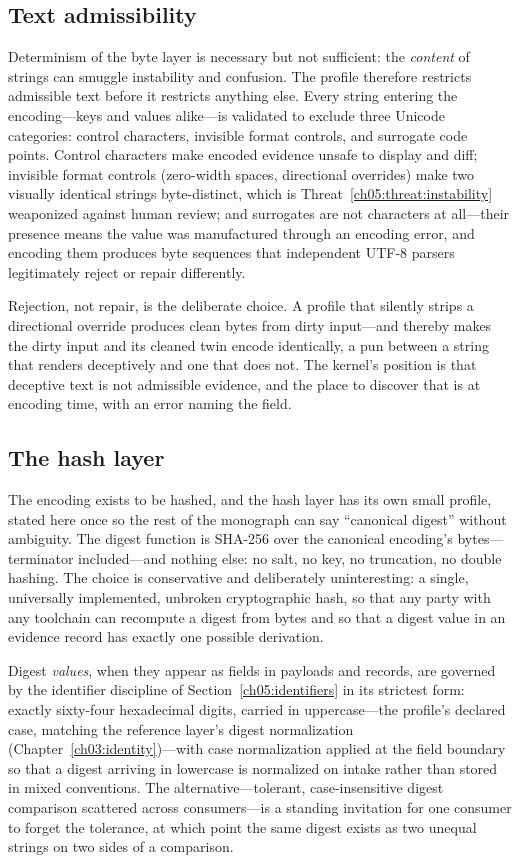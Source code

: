 \subsection{Text admissibility}

Determinism of the byte layer is necessary but not sufficient: the
\emph{content} of strings can smuggle instability and confusion. The profile
therefore restricts admissible text before it restricts anything else. Every
string entering the encoding---keys and values alike---is validated to
exclude three Unicode categories: control characters, invisible format
controls, and surrogate code points. Control characters make encoded
evidence unsafe to display and diff; invisible format controls (zero-width
spaces, directional overrides) make two visually identical strings
byte-distinct, which is Threat~\ref{ch05:threat:instability} weaponized
against human review; and surrogates are not characters at all---their
presence means the value was manufactured through an encoding error, and
encoding them produces byte sequences that independent UTF-8 parsers
legitimately reject or repair differently.

Rejection, not repair, is the deliberate choice. A profile that silently
strips a directional override produces clean bytes from dirty input---and
thereby makes the dirty input and its cleaned twin encode identically, a pun
between a string that renders deceptively and one that does not. The
kernel's position is that deceptive text is not admissible evidence, and the
place to discover that is at encoding time, with an error naming the field.

\subsection{The hash layer}\label{ch05:hashlayer}

The encoding exists to be hashed, and the hash layer has its own small
profile, stated here once so the rest of the monograph can say
``canonical digest'' without ambiguity. The digest function is SHA-256
over the canonical encoding's bytes---terminator included---and nothing
else: no salt, no key, no truncation, no double hashing. The choice is
conservative and deliberately uninteresting: a single, universally
implemented, unbroken cryptographic hash, so that any party with any
toolchain can recompute a digest from bytes and so that a digest value
in an evidence record has exactly one possible derivation.

Digest \emph{values}, when they appear as fields in payloads and
records, are governed by the identifier discipline of
Section~\ref{ch05:identifiers} in its strictest form: exactly sixty-four
hexadecimal digits, carried in uppercase---the profile's declared case,
matching the reference layer's digest normalization
(Chapter~\ref{ch03:identity})---with case normalization applied at the
field boundary so that a digest arriving in lowercase is normalized on
intake rather than stored in mixed conventions. The alternative---tolerant, case-insensitive
digest comparison scattered across consumers---is a standing invitation
for one consumer to forget the tolerance, at which point the same
digest exists as two unequal strings on two sides of a comparison.

